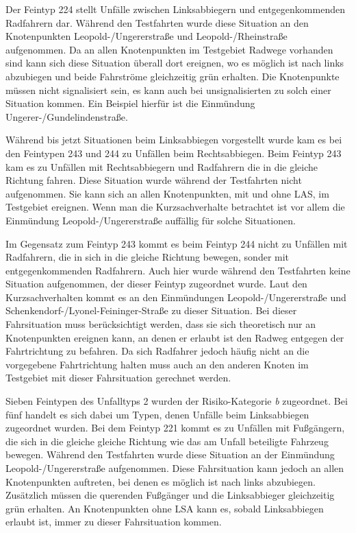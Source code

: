 Der Feintyp 224 stellt Unfälle zwischen Linksabbiegern und entgegenkommenden Radfahrern dar. Während den Testfahrten wurde diese Situation an den Knotenpunkten Leopold-/Ungererstraße und Leopold-/Rheinstraße aufgenommen. Da an allen Knotenpunkten im Testgebiet Radwege vorhanden sind kann sich diese Situation überall dort ereignen, wo es möglich ist nach links abzubiegen und beide Fahrströme gleichzeitig grün erhalten. Die Knotenpunkte müssen nicht signalisiert sein, es kann auch bei unsignalisierten zu solch einer Situation kommen. Ein Beispiel hierfür ist die Einmündung Ungerer-/Gundelindenstraße.

Während bis jetzt Situationen beim Linksabbiegen vorgestellt wurde kam es bei den Feintypen 243 und 244 zu Unfällen beim Rechtsabbiegen. Beim Feintyp 243 kam es zu Unfällen mit Rechtsabbiegern und Radfahrern die in die gleiche Richtung fahren. Diese Situation wurde während der Testfahrten nicht aufgenommen. Sie kann sich an allen Knotenpunkten, mit und ohne LAS, im Testgebiet ereignen. Wenn man die Kurzsachverhalte betrachtet ist vor allem die Einmündung Leopold-/Ungererstraße auffällig für solche Situationen.

Im Gegensatz zum Feintyp 243 kommt es beim Feintyp 244 nicht zu Unfällen mit Radfahrern, die in sich in die gleiche Richtung bewegen, sonder mit entgegenkommenden Radfahrern. Auch hier wurde während den Testfahrten keine Situation aufgenommen, der dieser Feintyp zugeordnet wurde. Laut den Kurzsachverhalten kommt es an den Einmündungen Leopold-/Ungererstraße und Schenkendorf-/Lyonel-Feininger-Straße zu dieser Situation. Bei dieser Fahrsituation muss berücksichtigt werden, dass sie sich theoretisch nur an Knotenpunkten ereignen kann, an denen er erlaubt ist den Radweg entgegen der Fahrtrichtung zu befahren. Da sich Radfahrer jedoch häufig nicht an die vorgegebene Fahrtrichtung halten muss auch an den anderen Knoten im Testgebiet mit dieser Fahrsituation gerechnet werden.

Sieben Feintypen des Unfalltyps 2 wurden der Risiko-Kategorie \textit{b} zugeordnet. Bei fünf handelt es sich dabei um Typen, denen Unfälle beim Linksabbiegen zugeordnet wurden. Bei dem Feintyp 221 kommt es zu Unfällen mit Fußgängern, die sich in die gleiche gleiche Richtung wie das am Unfall beteiligte Fahrzeug bewegen. Während den Testfahrten wurde diese Situation an der Einmündung Leopold-/Ungererstraße aufgenommen. Diese Fahrsituation kann jedoch an allen Knotenpunkten auftreten, bei denen es möglich ist nach links abzubiegen. Zusätzlich müssen die querenden Fußgänger und die Linksabbieger gleichzeitig grün erhalten. An Knotenpunkten ohne \ac{LSA} kann es, sobald Linksabbiegen erlaubt ist, immer zu dieser Fahrsituation kommen.   


